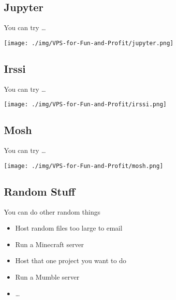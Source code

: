 \documentclass[presentation,aspectratio=169]{beamer}
\begin{document}
\subsection{Jupyter}
\label{sec-4-7}
\begin{frame}[label=sec-4-7-1]{You can try \ldots{}}
\begin{center}
\texttt{[image: ./img/VPS-for-Fun-and-Profit/jupyter.png]}
\end{center}
\end{frame}
\subsection{Irssi}
\label{sec-4-8}
\begin{frame}[label=sec-4-8-1]{You can try \ldots{}}
\begin{center}
\texttt{[image: ./img/VPS-for-Fun-and-Profit/irssi.png]}
\end{center}
\end{frame}
\subsection{Mosh}
\label{sec-4-9}
\begin{frame}[label=sec-4-9-1]{You can try \ldots{}}
\begin{center}
\texttt{[image: ./img/VPS-for-Fun-and-Profit/mosh.png]}
\end{center}
\end{frame}
\subsection{Random Stuff}
\label{sec-4-10}
\begin{frame}[label=sec-4-10-1]{You can do other random things}
\begin{itemize}
\item Host random files too large to email
\item Run a Minecraft server
\item Host that one project you want to do
\item Run a Mumble server
\item \ldots{}
\end{itemize}
\end{frame}
\end{document}
